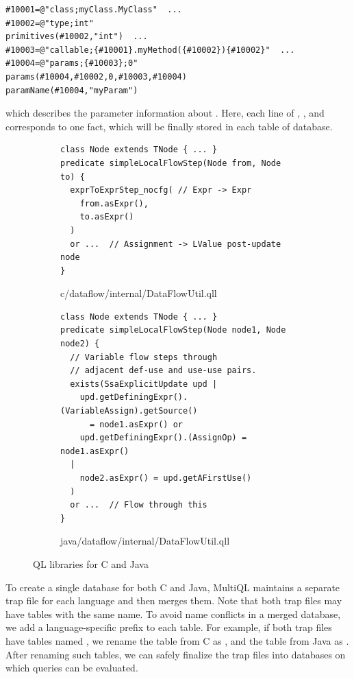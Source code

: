 \begin{lstlisting}[style=java,numbers=none]
#10001=@"class;myClass.MyClass"  ...
#10002=@"type;int"
primitives(#10002,"int")  ...
#10003=@"callable;{#10001}.myMethod({#10002}){#10002}"  ...
#10004=@"params;{#10003};0"
params(#10004,#10002,0,#10003,#10004)
paramName(#10004,"myParam")
\end{lstlisting}
which describes the parameter information about .
Here, each line of ,
, and
corresponds to one fact, which will be
finally stored in each table of database.


\begin{figure}[t]
  \centering
  \vspace{2mm}
  \begin{subfigure}[t]{0.5\textwidth}
\begin{lstlisting}[style=codeql,xleftmargin=2.5em]
class Node extends TNode { ... }
predicate simpleLocalFlowStep(Node from, Node to) {
  exprToExprStep_nocfg( // Expr -> Expr
    from.asExpr(),
    to.asExpr()
  )
  or ...  // Assignment -> LValue post-update node
}
\end{lstlisting}
    \vspace*{-.5em}
    \caption{c/dataflow/internal/DataFlowUtil.qll}
  \end{subfigure}
  \begin{subfigure}[t]{0.5\textwidth}
\begin{lstlisting}[style=codeql,xleftmargin=2.5em]
class Node extends TNode { ... }
predicate simpleLocalFlowStep(Node node1, Node node2) {
  // Variable flow steps through
  // adjacent def-use and use-use pairs.
  exists(SsaExplicitUpdate upd |
    upd.getDefiningExpr().(VariableAssign).getSource()
      = node1.asExpr() or
    upd.getDefiningExpr().(AssignOp) = node1.asExpr()
  |
    node2.asExpr() = upd.getAFirstUse()
  )
  or ...  // Flow through this
}
\end{lstlisting}
    \vspace*{-.5em}
    \caption{java/dataflow/internal/DataFlowUtil.qll}
  \end{subfigure}
  \vspace*{-.5em}
  \caption{QL libraries for C and Java}
  \label{fig:qll}
\end{figure}

To create a single database for both C and Java, MultiQL maintains
a separate trap file for each language and then merges them.
Note that both trap files may have tables with the same name.
To avoid name conflicts in a merged database, we add a
language-specific prefix to each table.
For example, if both trap files have tables named ,
we rename the table from C as ,
and the table from Java as .
After renaming such tables, we can safely finalize the trap files into
databases on which queries can be evaluated.

